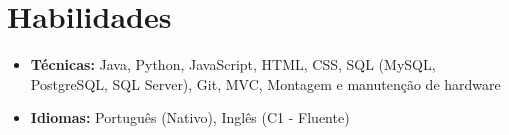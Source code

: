 \documentclass[a4paper,10pt]{article}
\begin{document}

\section{Habilidades}
    \begin{itemize}
        \item \textbf{Técnicas:} Java, Python, JavaScript, HTML, CSS, SQL (MySQL, PostgreSQL, SQL Server), Git, MVC, Montagem e manutenção de hardware
        \item \textbf{Idiomas:} Português (Nativo), Inglês (C1 - Fluente)
    \end{itemize}
\end{document}
